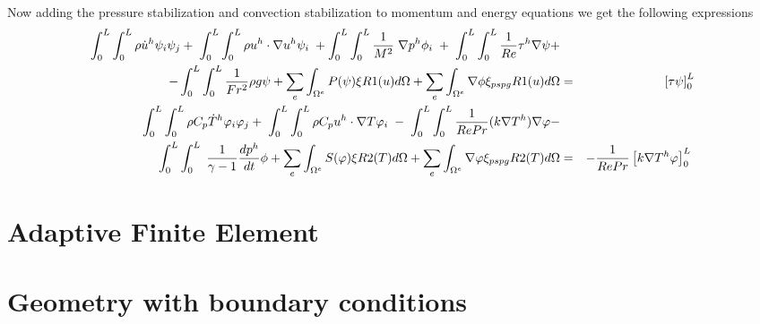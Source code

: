 \bigskip
 Now adding the pressure stabilization and convection stabilization to momentum and energy equations we get the following expressions
\begin{eqnarray*}
\int_{0}^{L} \int_{0}^{L}\rho \dot{u}^h \psi_i \psi_j + \hspace{1mm}\int_{0}^{L} \int_{0}^{L} \rho u^h \cdot \nabla u^h \psi_i \hspace{1mm}  + \int_{0}^{L} \int_{0}^{L}  \frac{1}{M^2}\hspace{1mm}\nabla p^h \phi_i \hspace{1mm} + \hspace{1mm}\int_{0}^{L} \int_{0}^{L}\frac{1}{Re} \tau^h \nabla \psi +  \\ - \int_{0}^{L} \int_{0}^{L}\frac{1}{Fr^2}\rho g \psi + \sum_e \int_{\Omega^e} P(\psi) \xi R1(u)  d\Omega + \sum_e \int_{\Omega^e} \nabla \phi \xi_{pspg} R1(u)  d\Omega  &=& \left[\tau \psi \right]_0^L \\
\int_{0}^{L} \int_{0}^{L} \rho C_p \dot{T}^h \varphi_i \varphi_j + \hspace{1mm}\int_{0}^{L} \int_{0}^{L} \rho C_p u^h \cdot \nabla T \varphi_i \hspace{1mm} - \hspace{1mm} \int_{0}^{L} \int_{0}^{L} \frac{1}{Re Pr}(k \nabla T^h) \nabla \varphi - \\ \int_{0}^{L} \int_{0}^{L} \hspace{1mm} \frac{1}{\gamma -1} \frac{d p^h}{d t} \phi +  \sum_e \int_{\Omega^e} S(\varphi) \xi R2(T)  d\Omega + \sum_e \int_{\Omega^e} \nabla \varphi \xi_{pspg} R2(T)  d\Omega &=& -  \frac{1}{Re Pr} \left[k \nabla T^h \varphi \right]_0^L \hspace{1mm}\\
\end{eqnarray*}


\section{Adaptive Finite Element}


\section{Geometry with boundary conditions}

